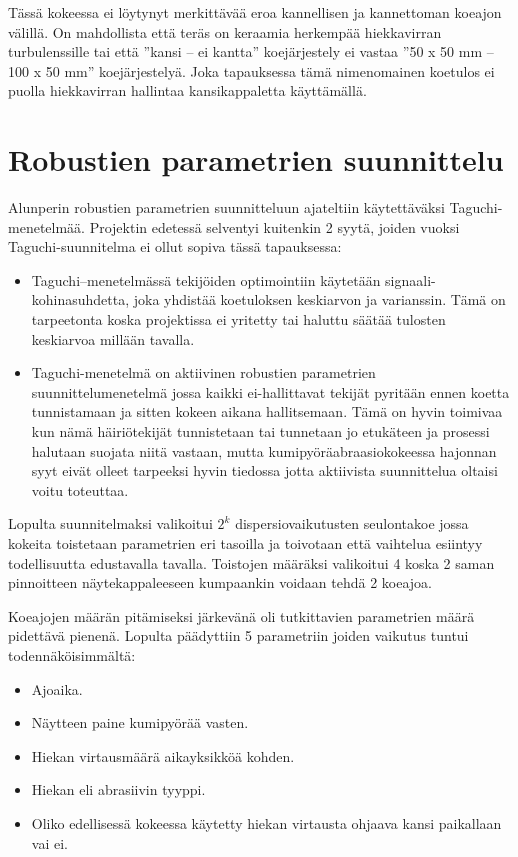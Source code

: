\documentclass[12pt,a4paper,finnish]{tutthesis}
\begin{document}
Tässä kokeessa ei löytynyt merkittävää eroa kannellisen ja kannettoman koeajon välillä.
On mahdollista että teräs on keraamia herkempää hiekkavirran turbulenssille tai että ”kansi – ei kantta” koejärjestely ei vastaa ”50 x 50 mm – 100 x 50 mm” koejärjestelyä. Joka tapauksessa tämä nimenomainen koetulos ei puolla hiekkavirran hallintaa kansikappaletta käyttämällä.

\section{Robustien parametrien suunnittelu}

Alunperin robustien parametrien suunnitteluun ajateltiin käytettäväksi
Taguchi-menetelmää. Projektin edetessä selventyi kuitenkin 2 syytä, joiden
vuoksi Taguchi-suunnitelma ei ollut sopiva tässä tapauksessa:

\begin{itemize}
  \item Taguchi–menetelmässä tekijöiden optimointiin käytetään
signaali-kohinasuhdetta, joka yhdistää koetuloksen keskiarvon ja varianssin. Tämä on tarpeetonta koska projektissa ei
yritetty tai haluttu säätää tulosten keskiarvoa millään tavalla.
  \item Taguchi-menetelmä on aktiivinen robustien parametrien suunnittelumenetelmä jossa kaikki ei-hallittavat tekijät pyritään ennen koetta tunnistamaan ja sitten kokeen aikana hallitsemaan. Tämä on hyvin toimivaa kun nämä häiriötekijät tunnistetaan tai tunnetaan jo etukäteen ja prosessi halutaan suojata niitä vastaan, mutta kumipyöräabraasiokokeessa
hajonnan syyt eivät olleet tarpeeksi hyvin tiedossa jotta aktiivista suunnittelua
oltaisi voitu toteuttaa.
\end{itemize}

Lopulta suunnitelmaksi valikoitui $2^k$ dispersiovaikutusten seulontakoe jossa kokeita toistetaan parametrien eri tasoilla ja toivotaan että vaihtelua esiintyy todellisuutta edustavalla tavalla. Toistojen määräksi valikoitui 4 koska 2
saman pinnoitteen näytekappaleeseen kumpaankin voidaan tehdä 2 koeajoa.

Koeajojen määrän pitämiseksi järkevänä oli tutkittavien parametrien määrä pidettävä pienenä. Lopulta päädyttiin 5 parametriin joiden vaikutus tuntui todennäköisimmältä:

\begin{itemize}
  \item Ajoaika.
  \item Näytteen paine kumipyörää vasten.
  \item Hiekan virtausmäärä aikayksikköä kohden.
  \item Hiekan eli abrasiivin tyyppi.
  \item Oliko edellisessä kokeessa käytetty hiekan virtausta ohjaava kansi paikallaan vai ei.
\end{itemize}
\end{document}
